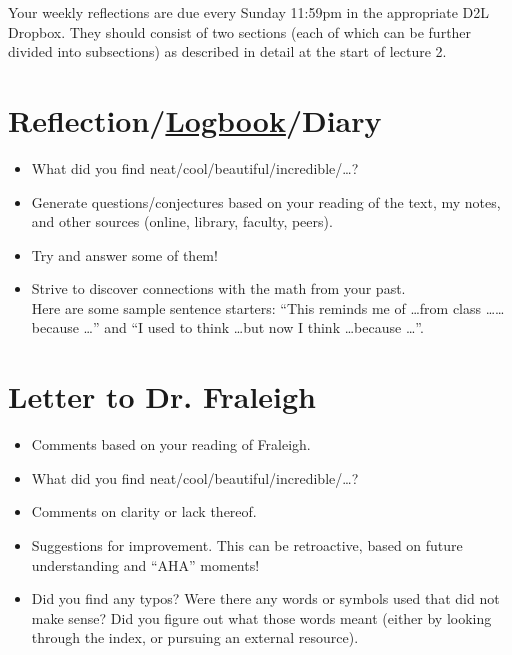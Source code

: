 \documentclass[11pt]{article}
\theoremstyle{plain}
\theoremstyle{definition}
\begin{document}
Your weekly reflections are due every Sunday 11:59pm in the appropriate D2L Dropbox. They should consist of two sections (each of which can be further divided into subsections) as described in detail at the start of lecture 2.

\section{Reflection/\href{https://en.wikipedia.org/wiki/Logbook}{Logbook}/Diary}

\begin{itemize}
\item What did you find neat/cool/beautiful/incredible/\dots?
\item Generate questions/conjectures based on your reading of the text, my notes, and other sources (online, library, faculty, peers).
\item Try and answer some of them! 
\item Strive to discover connections with the math from your past.\\
Here are some sample sentence starters: ``This reminds me of \dots from class \dots \dots because \dots'' and ``I used to think \dots but now I think \dots because \dots''.

\end{itemize}

\section{Letter to Dr. Fraleigh}

\begin{itemize}
\item Comments based on your reading of Fraleigh. 
\item What did you find neat/cool/beautiful/incredible/\dots?
\item Comments on clarity or lack thereof.
\item Suggestions for improvement. This can be retroactive, based on future understanding and ``AHA'' moments!
\item Did you find any typos? Were there any words or symbols used that did not make sense? Did you figure out what those words meant (either by looking through the index, or pursuing an external resource).
\end{itemize}

\clearpage
\end{document}
